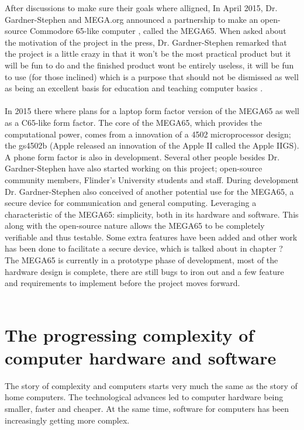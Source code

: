 After discussions to make sure their goals where alligned, In April 2015, Dr. Gardner-Stephen and MEGA.org announced a partnership to make an open-source Commodore 65-like computer \cite{megaintro}, called the MEGA65. When asked about the motivation of the project in the press, Dr. Gardner-Stephen remarked that the project is a little crazy in that it won't be the most practical product but it will be fun to do and the finished product wont be entirely useless, it will be fun to use (for those inclined) which is a purpose that should not be dismissed as well as being an excellent basis for education and teaching computer basics \cite{blogapril15}.  \\\\
In 2015 there where plans for a laptop form factor version of the MEGA65 as well as a C65-like form factor. The core of  the MEGA65, which provides the computational power, comes from a innovation of a 4502 microprocessor design; the gs4502b (Apple released an innovation of the Apple II called the Apple IIGS). A phone form factor is also in development. Several other people besides Dr. Gardner-Stephen have also started working on this project; open-source community members, Flinder's University students and staff. During development Dr. Gardner-Stephen also conceived of another potential use for the MEGA65, a secure device for communication and general computing. Leveraging a characteristic of the MEGA65: simplicity, both in its hardware and software. This along with the open-source nature allows the MEGA65 to be completely verifiable and thus testable. Some extra features have been added and other work has been done to facilitate a secure device, which is talked about in chapter ? The MEGA65 is currently in a prototype phase of development, most of the hardware design is complete, there are still bugs to iron out and a few feature and requirements to implement before the project moves forward. \\\\

\section{The progressing complexity of computer hardware and software}
The story of complexity and computers starts very much the same as the story of home computers. The technological advances led to computer hardware being smaller, faster and cheaper. At the same time, software for computers has been increasingly getting more complex. 

